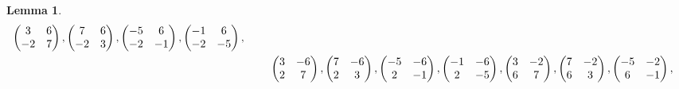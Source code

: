 \documentclass[12pt]{article}
\theoremstyle{definition}
\newtheorem{lemma}[theorem]{Lemma}
\numberwithin{equation}{section}
\numberwithin{theorem}{section}
\begin{document}
\begin{lemma}
{\begin{align*}
\begin{pmatrix}
3 & 6 \\
-2 & 7
\end{pmatrix}, 
\begin{pmatrix}
7 & 6 \\
-2 & 3
\end{pmatrix}, 
\begin{pmatrix}
-5 & 6 \\
-2 & -1
\end{pmatrix}, 
\begin{pmatrix}
-1 & 6 \\
-2 & -5
\end{pmatrix},   \\
&\hspace{8mm}
\begin{pmatrix}
3 & -6 \\
2 & 7
\end{pmatrix}, 
\begin{pmatrix}
7 & -6 \\
2 & 3
\end{pmatrix}, 
\begin{pmatrix}
-5 & -6 \\
2 & -1
\end{pmatrix}, 
\begin{pmatrix}
-1 & -6 \\
2 & -5
\end{pmatrix}, 
\begin{pmatrix}
3 & -2 \\
6 & 7
\end{pmatrix}, 
\begin{pmatrix}
7 & -2 \\
6 & 3
\end{pmatrix}, 
\begin{pmatrix}
-5 & -2 \\
6 & -1
\end{pmatrix}, 

\end{align*}}
\end{lemma}
\end{document}
